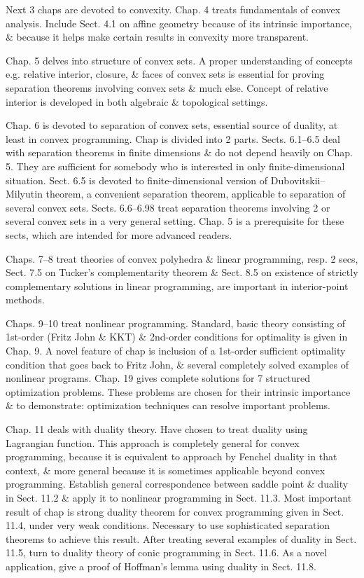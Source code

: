 \documentclass{article}
\begin{document}
\begin{itemize}
    Next 3 chaps are devoted to convexity. Chap. 4 treats fundamentals of convex analysis. Include Sect. 4.1 on affine geometry because of its intrinsic importance, \& because it helps make certain results in convexity more transparent.

    Chap. 5 delves into structure of convex sets. A proper understanding of concepts e.g. relative interior, closure, \& faces of convex sets is essential for proving separation theorems involving convex sets \& much else. Concept of relative interior is developed in both algebraic \& topological settings.

    Chap. 6 is devoted to separation of convex sets, essential source of duality, at least in convex programming. Chap is divided into 2 parts. Sects. 6.1--6.5 deal with separation theorems in finite dimensions \& do not depend heavily on Chap. 5. They are sufficient for somebody who is interested in only finite-dimensional situation. Sect. 6.5 is devoted to finite-dimensional version of Dubovitskii--Milyutin theorem, a convenient separation theorem, applicable to separation of several convex sets. Sects. 6.6--6.98 treat separation theorems involving 2 or several convex sets in a very general setting. Chap. 5 is a prerequisite for these sects, which are intended for more advanced readers.

    Chaps. 7--8 treat theories of convex polyhedra \& linear programming, resp. 2 secs, Sect. 7.5 on Tucker's complementarity theorem \& Sect. 8.5 on existence of strictly complementary solutions in linear programming, are important in interior-point methods.

    Chaps. 9--10 treat nonlinear programming. Standard, basic theory consisting of 1st-order (Fritz John \& KKT) \& 2nd-order conditions for optimality is given in Chap. 9. A novel feature of chap is inclusion of a 1st-order sufficient optimality condition that goes back to {\sc Fritz John}, \& several completely solved examples of nonlinear programs. Chap. 19 gives complete solutions for 7 structured optimization problems. These problems are chosen for their intrinsic importance \& to demonstrate: optimization techniques can resolve important problems.

    Chap. 11 deals with duality theory. Have chosen to treat duality using Lagrangian function. This approach is completely general for convex programming, because it is equivalent to approach by Fenchel duality in that context, \& more general because it is sometimes applicable beyond convex programming. Establish general correspondence between saddle point \& duality in Sect. 11.2 \& apply it to nonlinear programming in Sect. 11.3. Most important result of chap is strong duality theorem for convex programming given in Sect. 11.4, under very weak conditions. Necessary to use sophisticated separation theorems to achieve this result. After treating several examples of duality in Sect. 11.5, turn to duality theory of conic programming in Sect. 11.6. As a novel application, give a proof of Hoffman's lemma using duality in Sect. 11.8.


\end{itemize}
\end{document}
